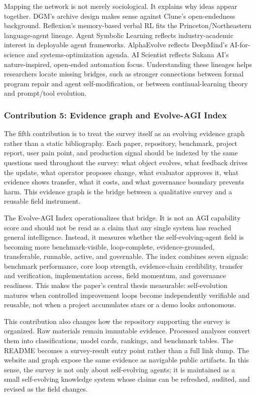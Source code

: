 Mapping the network is not merely sociological. It explains why ideas appear together. DGM's archive design makes sense against Clune's open-endedness background. Reflexion's memory-based verbal RL fits the Princeton/Northeastern language-agent lineage. Agent Symbolic Learning reflects industry-academic interest in deployable agent frameworks. AlphaEvolve reflects DeepMind's AI-for-science and systems-optimization agenda. AI Scientist reflects Sakana AI's nature-inspired, open-ended automation focus. Understanding these lineages helps researchers locate missing bridges, such as stronger connections between formal program repair and agent self-modification, or between continual-learning theory and prompt/tool evolution.

\subsubsection{Contribution 5: Evidence graph and Evolve-AGI Index}

The fifth contribution is to treat the survey itself as an evolving evidence graph rather than a static bibliography. Each paper, repository, benchmark, project report, user pain point, and production signal should be indexed by the same questions used throughout the survey: what object evolves, what feedback drives the update, what operator proposes change, what evaluator approves it, what evidence shows transfer, what it costs, and what governance boundary prevents harm. This evidence graph is the bridge between a qualitative survey and a reusable field instrument.

The Evolve-AGI Index operationalizes that bridge. It is not an AGI capability score and should not be read as a claim that any single system has reached general intelligence. Instead, it measures whether the self-evolving-agent field is becoming more benchmark-visible, loop-complete, evidence-grounded, transferable, runnable, active, and governable. The index combines seven signals: benchmark performance, core loop strength, evidence-chain credibility, transfer and verification, implementation access, field momentum, and governance readiness. This makes the paper's central thesis measurable: self-evolution matures when controlled improvement loops become independently verifiable and reusable, not when a project accumulates stars or a demo looks autonomous.

This contribution also changes how the repository supporting the survey is organized. Raw materials remain immutable evidence. Processed analyses convert them into classifications, model cards, rankings, and benchmark tables. The README becomes a survey-result entry point rather than a full link dump. The website and graph expose the same evidence as navigable public artifacts. In this sense, the survey is not only about self-evolving agents; it is maintained as a small self-evolving knowledge system whose claims can be refreshed, audited, and revised as the field changes.


